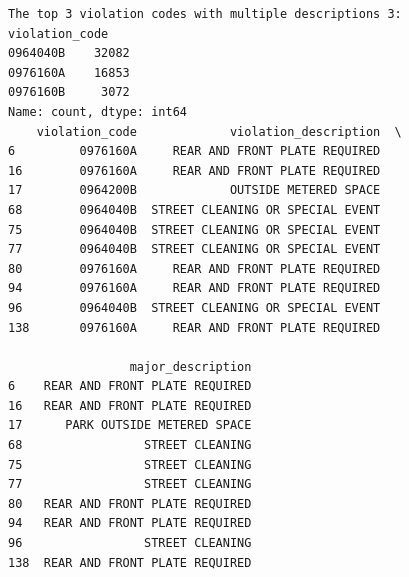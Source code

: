 \documentclass[
  letterpaper,
  DIV=11,
  numbers=noendperiod]{scrartcl}
\begin{document}
\begin{verbatim}
The top 3 violation codes with multiple descriptions 3:
violation_code
0964040B    32082
0976160A    16853
0976160B     3072
Name: count, dtype: int64
    violation_code             violation_description  \
6         0976160A     REAR AND FRONT PLATE REQUIRED   
16        0976160A     REAR AND FRONT PLATE REQUIRED   
17        0964200B             OUTSIDE METERED SPACE   
68        0964040B  STREET CLEANING OR SPECIAL EVENT   
75        0964040B  STREET CLEANING OR SPECIAL EVENT   
77        0964040B  STREET CLEANING OR SPECIAL EVENT   
80        0976160A     REAR AND FRONT PLATE REQUIRED   
94        0976160A     REAR AND FRONT PLATE REQUIRED   
96        0964040B  STREET CLEANING OR SPECIAL EVENT   
138       0976160A     REAR AND FRONT PLATE REQUIRED   

                 major_description  
6    REAR AND FRONT PLATE REQUIRED  
16   REAR AND FRONT PLATE REQUIRED  
17      PARK OUTSIDE METERED SPACE  
68                 STREET CLEANING  
75                 STREET CLEANING  
77                 STREET CLEANING  
80   REAR AND FRONT PLATE REQUIRED  
94   REAR AND FRONT PLATE REQUIRED  
96                 STREET CLEANING  
138  REAR AND FRONT PLATE REQUIRED  
\end{verbatim}
\end{document}
